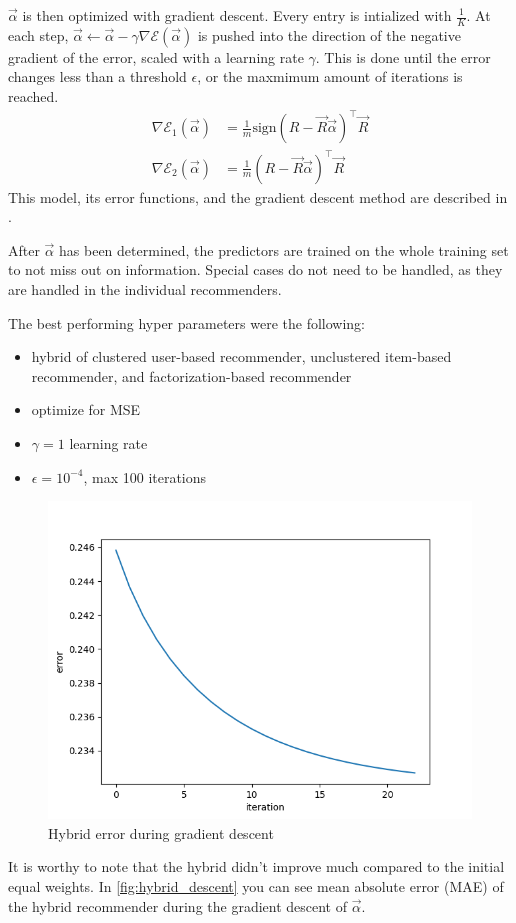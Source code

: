 \documentclass[sigconf]{acmart}
\def\T{\top}
\begin{document}
$\vec{\alpha}$ is then optimized with gradient descent. Every entry is intialized with $\frac{1}{K}$.
At each step, $\vec{\alpha} \gets \vec{\alpha} - \gamma \nabla\mathcal{E}(\vec{\alpha})$ is pushed into the direction of the negative gradient of the error, scaled with a learning rate $\gamma$.
This is done until the error changes less than a threshold $\epsilon$, or the maxmimum amount of iterations is reached.
\begin{align*}
	\nabla\mathcal{E}_1(\vec{\alpha}) & = \frac{1}{m} \text{sign}\left(R - \vec{R} \vec{\alpha}\right)^\T \vec{R} \\
	\nabla\mathcal{E}_2(\vec{\alpha}) & = \frac{1}{m} \left(R - \vec{R} \vec{\alpha}\right)^\T \vec{R}
\end{align*}
This model, its error functions, and the gradient descent method are described in \cite[Chapter~6, Section~3]{Aggarwal2016}.

After $\vec{\alpha}$ has been determined, the predictors are trained on the whole training set to not miss out on information.
Special cases do not need to be handled, as they are handled in the individual recommenders.

The best performing hyper parameters were the following:
\begin{itemize}
	\item hybrid of clustered user-based recommender, unclustered item-based recommender, and factorization-based recommender
	\item optimize for MSE
	\item $\gamma = 1$ learning rate
	\item $\epsilon = 10^{-4}$, max 100 iterations
\end{itemize}

\begin{figure}[!htb]
	\centering
	\includegraphics[scale=0.4]{descent.png}
	\caption{Hybrid error during gradient descent}\label{fig:hybrid_descent}
\end{figure}
It is worthy to note that the hybrid didn't improve much compared to the initial equal weights.
In \autoref{fig:hybrid_descent} you can see mean absolute error (MAE) of the hybrid recommender during the gradient descent of $\vec{\alpha}$.
\end{document}
